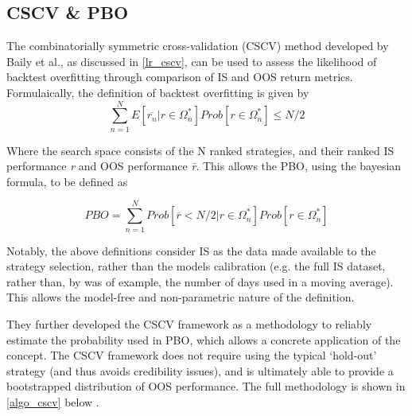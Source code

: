\documentclass[a4paper,11pt,oneside]{article}
\theoremstyle{plain}
\theoremstyle{definition}
\begin{document}
\subsection{CSCV \& PBO}\label{imp_cscv}

The  combinatorially symmetric cross-validation (CSCV) method developed by Baily et al., as discussed in \ref{lr_cscv}, can be used to assess the likelihood of backtest overfitting through comparison of IS and OOS return metrics. Formulaically, the definition of backtest overfitting is given by
\begin{equation}\label{eq:PBO1}
\sum_{n=1}^{N}E[\overline{r_n}|r\in 
\Omega_{n}^{*}]Prob[r\in\Omega_{n}^{*}]\leq{N/2}
\end{equation}

Where the search space {\textOmega} consists of the N ranked strategies, and their ranked IS performance \textit{r} and OOS performance
\textit{\={r}}. This allows the PBO, using the bayesian formula, to be defined as 

\begin{equation}\label{eq:PBO2}
PBO = \sum_{n=1}^{N}Prob[\overline{r} < {N/2}|r\in\Omega_{n}^{*}]Prob[r\in\Omega_{n}^{*}]
\end{equation}

Notably, the above definitions consider IS as the data made available to the strategy selection, rather than the 
models calibration (e.g. the full IS dataset, rather than, by was of example, the number of days used in a moving average). 
This allows the model-free and non-parametric nature of the definition. 
\hfill \break 

They further developed the CSCV framework as a methodology to reliably estimate the probability used in PBO, which allows a concrete application of the concept. The CSCV framework does not require using the typical ‘hold-out’ strategy (and thus avoids credibility issues), and is ultimately able to provide a bootstrapped distribution of OOS performance. The full methodology is shown in \ref{algo_cscv} below \cite{BailyPBO}.
\hfill \break 
\end{document}
